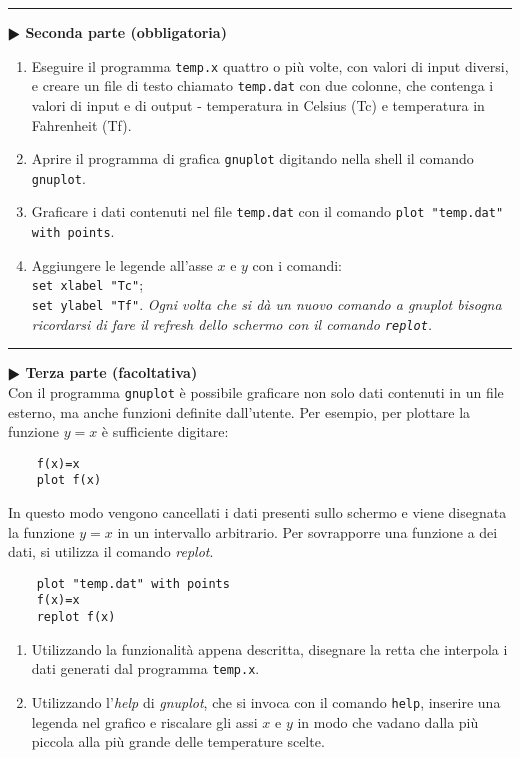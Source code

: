 \documentclass[11pt]{article}
\begin{document}
\newpage

\hrule
\vspace{2mm}
\textbf{$\RHD$ Seconda parte (obbligatoria)} 
%
\begin{enumerate}
\item Eseguire il programma \texttt{temp.x} quattro o pi\`u volte, con valori di input diversi, e creare un file di testo chiamato \texttt{temp.dat} con due colonne,
  che contenga i valori di input e di output - temperatura in Celsius (Tc) e
  temperatura in Fahrenheit (Tf).
\item Aprire il programma di grafica \texttt{gnuplot} digitando nella shell il
  comando \texttt{gnuplot}.
\item Graficare i dati contenuti nel file \texttt{temp.dat} con il comando
  \texttt{plot "temp.dat" with points}.
\item Aggiungere le legende all'asse $x$ e $y$ con i comandi:
\\
  \texttt{set xlabel "Tc"};
\\
\texttt{set ylabel "Tf"}.
          {\em Ogni volta che si d\`a un nuovo comando a gnuplot bisogna ricordarsi di fare il refresh dello schermo con il comando \texttt{replot}.}
  \end{enumerate}


\hrule
\vspace{2mm}\textbf{$\RHD$ Terza parte (facoltativa)\\}
%
Con il programma \texttt{gnuplot} \`e possibile graficare non solo dati contenuti in un file esterno, ma anche funzioni definite dall'utente. Per esempio,
per plottare la funzione $y=x$ \`e sufficiente digitare: 
\begin{mdframed}[backgroundcolor=gray!10]
  \begin{verbatim}
    f(x)=x
    plot f(x)
\end{verbatim}
\end{mdframed}
In questo modo vengono cancellati i dati presenti sullo schermo e viene disegnata la funzione $y=x$ in un intervallo arbitrario. Per sovrapporre una funzione a dei dati, si utilizza il comando {\em replot}.

\begin{mdframed}[backgroundcolor=gray!10]
  \begin{verbatim}
    plot "temp.dat" with points
    f(x)=x
    replot f(x)
\end{verbatim}
\end{mdframed}

\begin{enumerate}
\item Utilizzando la funzionalit\`a appena descritta, disegnare la retta che interpola i dati generati dal programma \texttt{temp.x}.
\item Utilizzando l'{\em help} di {\em gnuplot}, che si invoca con il comando
  \texttt{help}, inserire una legenda nel grafico e riscalare gli assi $x$ e $y$ in modo che vadano dalla pi\`u piccola alla pi\`u grande delle temperature scelte. 
\end{enumerate}  
\end{document}
